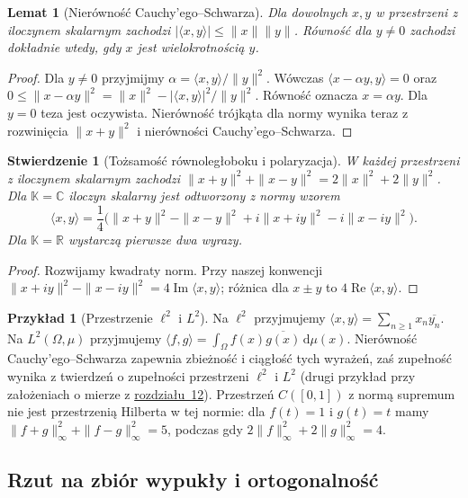 \documentclass[11pt,a4paper]{article}
\numberwithin{equation}{section}
\theoremstyle{plain}
\newtheorem{stwierdzenie}[twierdzenie]{Stwierdzenie}
\newtheorem{lemat}[twierdzenie]{Lemat}
\theoremstyle{definition}
\newtheorem{przyklad}[twierdzenie]{Przykład}
\theoremstyle{remark}
\newcommand{\R}{\mathbb R}
\newcommand{\C}{\mathbb C}
\newcommand{\K}{\mathbb K}
\begin{document}
\begin{lemat}[Nierówność Cauchy'ego--Schwarza]
\label{lem:cs13}
Dla dowolnych $x,y$ w przestrzeni z iloczynem skalarnym zachodzi
$|\langle x,y\rangle|\le\|x\|\|y\|$.
Równość dla $y\ne0$ zachodzi dokładnie wtedy, gdy $x$ jest
wielokrotnością $y$.
\end{lemat}
\begin{proof}
Dla $y\ne0$ przyjmijmy $\alpha=\langle x,y\rangle/\|y\|^2$.
Wówczas $\langle x-\alpha y,y\rangle=0$ oraz
$0\le\|x-\alpha y\|^2=\|x\|^2-|\langle x,y\rangle|^2/\|y\|^2$.
Równość oznacza $x=\alpha y$. Dla $y=0$ teza jest oczywista.
Nierówność trójkąta dla normy wynika teraz z rozwinięcia
$\|x+y\|^2$ i nierówności Cauchy'ego--Schwarza.
\end{proof}

\begin{stwierdzenie}[Tożsamość równoległoboku i polaryzacja]
\label{prop:parallelogram13}
W każdej przestrzeni z iloczynem skalarnym zachodzi
$\|x+y\|^2+\|x-y\|^2=2\|x\|^2+2\|y\|^2$.
Dla $\K=\C$ iloczyn skalarny jest odtworzony z normy wzorem
\[
\langle x,y\rangle=\frac14\bigl(\|x+y\|^2-\|x-y\|^2
+i\|x+iy\|^2-i\|x-iy\|^2\bigr).
\]
Dla $\K=\R$ wystarczą pierwsze dwa wyrazy.
\end{stwierdzenie}
\begin{proof}
Rozwijamy kwadraty norm. Przy naszej konwencji
$\|x+iy\|^2-\|x-iy\|^2=4\operatorname{Im}\langle x,y\rangle$;
różnica dla $x\pm y$ to $4\operatorname{Re}\langle x,y\rangle$.
\end{proof}

\begin{przyklad}[Przestrzenie $\ell^2$ i $L^2$]
\label{ex:hilbert-l2-13}
Na $\ell^2$ przyjmujemy $\langle x,y\rangle=\sum_{n\ge1}x_n\overline{y_n}$.
Na $L^2(\Omega,\mu)$ przyjmujemy
$\langle f,g\rangle=\int_\Omega f(x)\overline{g(x)}\,\mathrm d\mu(x)$.
Nierówność Cauchy'ego--Schwarza zapewnia zbieżność i ciągłość tych
wyrażeń, zaś zupełność wynika z
twierdzeń o zupełności przestrzeni $\ell^2$ i $L^2$
(drugi przykład przy założeniach o mierze z \hyperref[sec:klasyczne-banach12]{rozdziału~12}).
Przestrzeń $C([0,1])$ z normą supremum nie jest przestrzenią Hilberta w tej normie:
dla $f(t)=1$ i $g(t)=t$ mamy
$\|f+g\|_\infty^2+\|f-g\|_\infty^2=5$,
podczas gdy $2\|f\|_\infty^2+2\|g\|_\infty^2=4$.
\end{przyklad}

\subsection{Rzut na zbiór wypukły i ortogonalność}
\end{document}

